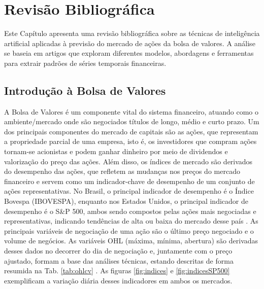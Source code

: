 \chapter[Revisão Bibliográfica]{Revisão Bibliográfica}

Este Capítulo apresenta uma revisão bibliográfica sobre as técnicas de inteligência artificial aplicadas à previsão do mercado de ações da bolsa de valores. A análise se baseia em artigos que exploram diferentes modelos, abordagens e ferramentas para extrair padrões de séries temporais financeiras.

\section{Introdução à Bolsa de Valores}

A Bolsa de Valores é um componente vital do sistema financeiro, atuando como o ambiente/mercado onde são negociados títulos de longo, médio e curto prazo. Um dos principais componentes do mercado de capitais são as ações, que representam a propriedade parcial de uma empresa, isto é, os investidores que compram ações tornam-se acionistas e podem ganhar dinheiro por meio de dividendos e valorização do preço das ações. Além disso, os índices de mercado são derivados do desempenho das ações, que refletem as mudanças nos preços do mercado financeiro e servem como um indicador-chave de desempenho de um conjunto de ações representativas. No Brasil, o principal indicador de desempenho é o Índice Bovespa (IBOVESPA), enquanto nos Estados Unidos, o principal indicador de desempenho é o S\&P 500, ambos sendo compostos pelas ações mais negociadas e representativas, indicando tendências de alta ou baixa do mercado desse país \cite{Ferro2024AvaliacaoEnsemble}. As principais variáveis de negociação de uma ação são o último preço negociado e o volume de negócios. As variáveis OHL (máxima, mínima, abertura) são derivadas desses dados no decorrer do dia de negociação e, juntamente com o preço ajustado, formam a base das análises técnicas, estando descritas de forma resumida na Tab. \ref{tab:ohlcv} . As figuras \ref{fig:indices} e \ref{fig:indicesSP500} exemplificam a variação diária desses indicadores em ambos os mercados.

